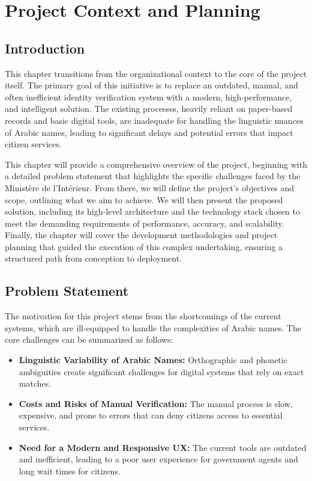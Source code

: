 \chapter{Project Context and Planning}

\section{Introduction}
This chapter transitions from the organizational context to the core of the project itself. The primary goal of this initiative is to replace an outdated, manual, and often inefficient identity verification system with a modern, high-performance, and intelligent solution. The existing processes, heavily reliant on paper-based records and basic digital tools, are inadequate for handling the linguistic nuances of Arabic names, leading to significant delays and potential errors that impact citizen services.

This chapter will provide a comprehensive overview of the project, beginning with a detailed problem statement that highlights the specific challenges faced by the Ministère de l'Intérieur. From there, we will define the project's objectives and scope, outlining what we aim to achieve. We will then present the proposed solution, including its high-level architecture and the technology stack chosen to meet the demanding requirements of performance, accuracy, and scalability. Finally, the chapter will cover the development methodologies and project planning that guided the execution of this complex undertaking, ensuring a structured path from conception to deployment.

\section{Problem Statement}
The motivation for this project stems from the shortcomings of the current systems, which are ill-equipped to handle the complexities of Arabic names. The core challenges can be summarized as follows:
\begin{itemize}
    \item \textbf{Linguistic Variability of Arabic Names:} Orthographic and phonetic ambiguities create significant challenges for digital systems that rely on exact matches.
    \item \textbf{Costs and Risks of Manual Verification:} The manual process is slow, expensive, and prone to errors that can deny citizens access to essential services.
    \item \textbf{Need for a Modern and Responsive UX:} The current tools are outdated and inefficient, leading to a poor user experience for government agents and long wait times for citizens.
\end{itemize}

